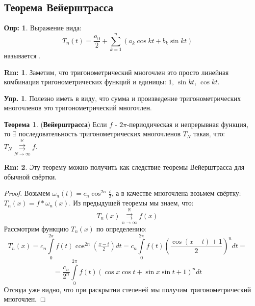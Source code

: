 \documentclass[12pt]{article}
\newcommand{\MR}{\mathbb{R}}
\theoremstyle{definition}
\newtheorem{defn}{Опр:}
\newtheorem{rem}{Rm:}
\newtheorem{exrc}{Упр.}
\newtheorem{theorem}{Теорема}
\newcommand{\ddsum}[2]{\displaystyle\sum\limits_{#1}^{#2}}
\newcommand{\ddint}[2]{\displaystyle\int\limits_{#1}^{#2}}
\newcommand{\uconvm}[2]{\overset{#1}{\underset{#2}{\rightrightarrows}}}
\begin{document}
\newpage
\subsection*{Теорема Вейерштрасса}
\begin{defn}
	Выражение вида: 
	$$
		T_n(t) = \dfrac{a_0}{2} + \ddsum{k = 1}{n}(a_k\cos{kt} + b_k\sin{kt})
	$$ 
	называется .
\end{defn}
\begin{rem}
	Заметим, что тригонометрический многочлен это просто линейная комбинация тригонометрических функций и единицы: $1, \, \sin{kt},\, \cos{kt}$.
\end{rem}
\begin{exrc}
	Полезно иметь в виду, что сумма и произведение тригонометрических многочленов это тригонометрический многочлен.
\end{exrc}
\begin{theorem}(\textbf{Вейерштрасса})
	Если $f$ - $2\pi$-периодическая и непрерывная функция, то $\exists$ последовательность тригонометрических многочленов $T_N$ такая, что: $T_N \uconvm{\MR}{N \to \infty} f$.	
\end{theorem}
\begin{rem}
	Эту теорему можно получить как следствие теоремы Вейерштрасса для обычной свёртки.
\end{rem}
\begin{proof}
	Возьмем $\omega_n(t) = c_n\cos^{2n}{\frac{t}{2}}$, а в качестве многочлена возьмем свёртку: $T_n(x) = f*\omega_n(x)$. Из предыдущей теоремы мы знаем, что: 
	$$
		T_n(x) \uconvm{\MR}{n\to \infty}f(x)
	$$ 
	Рассмотрим функцию $T_n(x)$ по определению:
	$$
		T_n(x) = c_n \ddint{0}{2\pi}f(t)\cos^{2n}{\left(\tfrac{x-t}{2}\right)}dt = c_n \ddint{0}{2\pi}f(t)\left(\dfrac{\cos{(x-t)} + 1}{2}\right)^n dt =
	$$
	$$
		= \dfrac{c_n}{2^n}\ddint{0}{2\pi}f(t)(\cos{x}\cos{t} + \sin{x}\sin{t} + 1)^n dt
	$$
	Отсюда уже видно, что при раскрытии степеней мы получим тригонометрический многочлен.
\end{proof}
\end{document}
